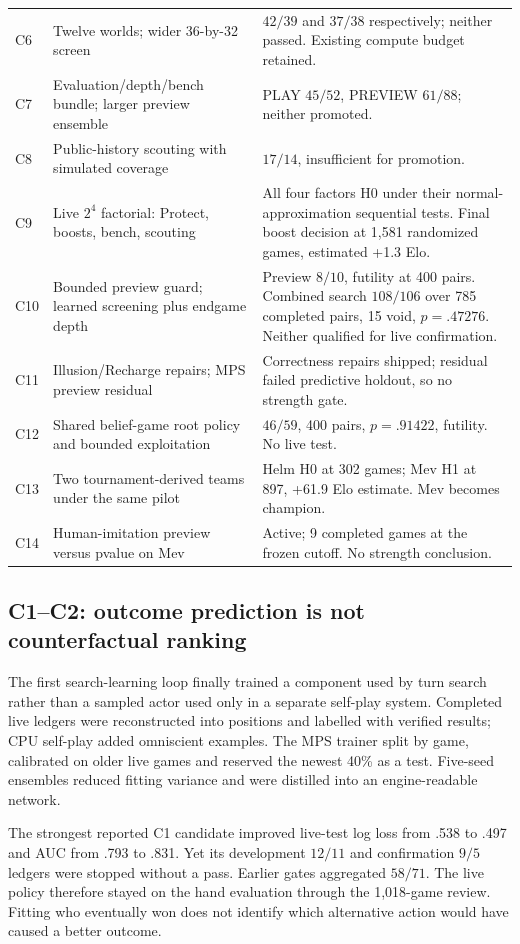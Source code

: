 \begin{small}
\begin{longtable}{>{\raggedright\arraybackslash}p{.10\linewidth}
  >{\raggedright\arraybackslash}p{.34\linewidth}
  >{\raggedright\arraybackslash}p{.47\linewidth}}
C6 & Twelve worlds; wider 36-by-32 screen & $42/39$ and $37/38$ respectively;
neither passed. Existing compute budget retained. \\
C7 & Evaluation/depth/bench bundle; larger preview ensemble & PLAY $45/52$,
PREVIEW $61/88$; neither promoted. \\
C8 & Public-history scouting with simulated coverage & $17/14$, insufficient
for promotion. \\
C9 & Live $2^4$ factorial: Protect, boosts, bench, scouting & All four factors
H0 under their normal-approximation sequential tests. Final boost decision
at 1,581 randomized games, estimated +1.3 Elo. \\
C10 & Bounded preview guard; learned screening plus endgame depth & Preview
$8/10$, futility at 400 pairs. Combined search $108/106$ over 785 completed
pairs, 15 void, $p=.47276$. Neither qualified for live confirmation. \\
C11 & Illusion/Recharge repairs; MPS preview residual & Correctness repairs
shipped; residual failed predictive holdout, so no strength gate. \\
C12 & Shared belief-game root policy and bounded exploitation & $46/59$,
400 pairs, $p=.91422$, futility. No live test. \\
C13 & Two tournament-derived teams under the same pilot & Helm H0 at 302
games; Mev H1 at 897, +61.9 Elo estimate. Mev becomes champion. \\
C14 & Human-imitation preview versus pvalue on Mev & Active; 9 completed
games at the frozen cutoff. No strength conclusion. \\
\bottomrule
\end{longtable}
\end{small}

\subsection{C1--C2: outcome prediction is not counterfactual ranking}
The first search-learning loop finally trained a component used by turn
search rather than a sampled actor used only in a separate self-play system.
Completed live ledgers were reconstructed into positions and labelled with
verified results; CPU self-play added omniscient examples. The MPS trainer
split by game, calibrated on older live games and reserved the newest 40\%
as a test. Five-seed ensembles reduced fitting variance and were distilled
into an engine-readable network.

The strongest reported C1 candidate improved live-test log loss from .538
to .497 and AUC from .793 to .831. Yet its development $12/11$ and
confirmation $9/5$ ledgers were stopped without a pass. Earlier gates
aggregated $58/71$. The live policy therefore stayed on the hand evaluation
through the 1,018-game review. Fitting who eventually won does not identify
which alternative action would have caused a better outcome.

